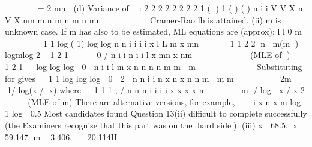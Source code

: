 \documentclass[a4paper,12pt]{article}
\begin{document}
    

=
2
mn

(d) Variance of  :
2 2
2 2 2 2 2 2
1
( ) 1 ( ) ( )
n
i
i
V V X n V X nm
m n m n m n mn 
 
     
Cramer-Rao lb is attained.
(ii) m is unknown case.
If m has also to be estimated, ML equations are (approx):
l l 0
m
 
 
 
  1
1 log ( 1) log log
n
n i i
i i
x
l L m x mn 

     



1 1
2 2 n \Gammam\beta (m ) logm\beta log 2
1
2 1
     0 /
n
i i n
i i
l x mn x nm 


   \beta 
  

 (MLE of )
 
1
2
1
  log log log  0

n
i i
l m x n n n n m
m  m
\beta   
  \Gamma   		   \beta 
 

Substituting for \hat{\beta}
gives
 
1
1 log log log  0
 2 
n n
i i
n x n x n n m
 m m
 
 \Gamma  \beta  
 	

2m 1/ log(x / x) where  
1
1 1 , / n n n
i i i i x x x x n
 
   
 m / log  x / x 2   \Gamma
 (MLE of m)
There are alternative versions, for example,
 

i x
n
x
m
log 1 log
 0.5
Most candidates found Question 13(ii) difficult to complete successfully (the Examiners
recognise that this part was on the hard side).
(iii) x  68.5, x  59.147 m  3.406,   20.114H
\end{document}
